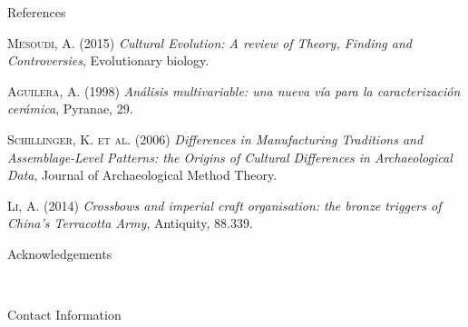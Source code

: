 \documentclass[final]{beamer}
\newlength{\onecolwid}
\begin{document}
\begin{frame}[t]
\begin{columns}[t]
\begin{column}{\onecolwid}
\begin{block}{References}
\begin{thebibliography}{50}
	\textsc{Mesoudi, A. (2015)}
	\textit{Cultural Evolution: A review of Theory, Finding and Controversies}, Evolutionary biology.

	\textsc{Aguilera, A. (1998)}
	\textit{An\'alisis multivariable: una nueva v\'ia para la caracterizaci\'on cer\'amica}, Pyranae, 29.

	\textsc{Schillinger, K. et al. (2006)}
	\textit{Differences in Manufacturing Traditions and Assemblage-Level Patterns: the Origins of Cultural Differences in Archaeological Data}, Journal of Archaeological Method Theory.

	\textsc{Li, A. (2014)}
	\textit{Crossbows and imperial craft organisation: the bronze triggers of China's Terracotta Army}, Antiquity, 88.339.

\end{thebibliography}

\end{block}



\begin{block}{Acknowledgements}

\small{} \\

\end{block}



\begin{alertblock}{Contact Information}


\end{alertblock}
\end{column}
\end{columns}
\end{frame}
\end{document}
